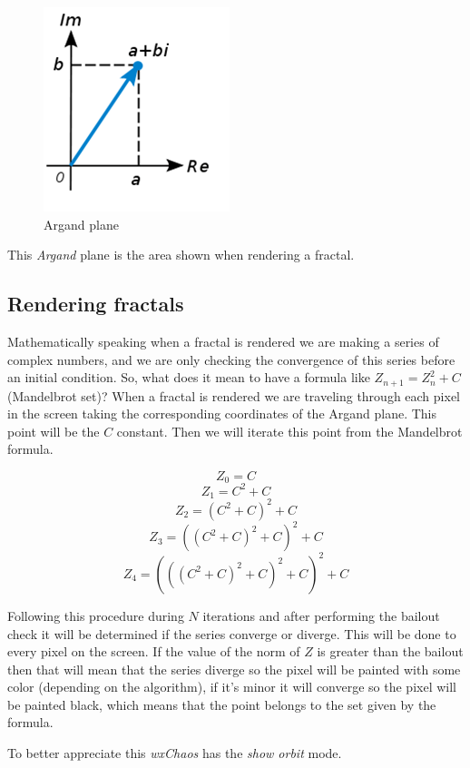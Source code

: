 \documentclass[oneside]{book}
\begin{document}
\begin{figure}[h!]
	\centering
	\includegraphics[scale=0.7]{img/complex.png}
	\caption{Argand plane}
	\label{Argand}
\end{figure}

This \textit{Argand} plane is the area shown when rendering a fractal.

\subsection{Rendering fractals}
Mathematically speaking when a fractal is rendered we are making a series of complex numbers, and we are only checking the convergence of this series before an initial condition. So, what does it mean to have a formula like $Z_{n+1} = Z_n^2 + C$ (Mandelbrot set)? When a fractal is rendered we are traveling through each pixel in the screen taking the corresponding coordinates of the Argand plane. This point will be the $C$ constant. Then we will iterate this point from the Mandelbrot formula.

\[
	Z_0 = C
\]
\[
	Z_1 = C^2 + C
\]
\[
	Z_2 = (C^2 + C)^2 + C
\]
\[
	Z_3 = ((C^2 + C)^2 + C)^2 + C
\]
\[
	Z_4 = (((C^2 + C)^2 + C)^2 + C)^2 + C
\]

Following this procedure during $N$ iterations and after performing the bailout check it will be determined if the series converge or diverge. This will be done to every pixel on the screen. If the value of the norm of $Z$ is greater than the bailout then that will mean that the series diverge so the pixel will be painted with some color (depending on the algorithm), if it's minor it will converge so the pixel will be painted black, which means that the point belongs to the set given by the formula. 

To better appreciate this \textit{wxChaos} has the \textit{show orbit} mode.
\end{document}
